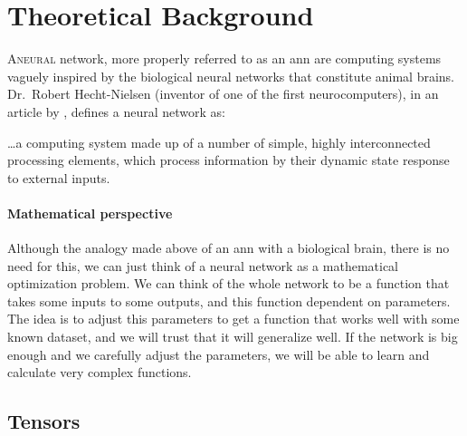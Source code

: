 

\chapter{Theoretical Background}\label{cha:theory}



\lettrine{A}{neural} network, more properly referred to as an \gls{ann} are
computing systems vaguely inspired by the biological neural networks that
constitute animal brains. Dr.\ Robert Hecht-Nielsen (inventor of one of the
first neurocomputers), in an article by
, defines a neural network as:

\begin{quoteBox}
  \ldots a computing system made up of a number of simple, highly
  interconnected processing elements, which process information by their
  dynamic state response to external inputs.
  \tcblower{}
\end{quoteBox}

\subsubsection{Mathematical perspective}

Although the analogy made above of an \gls{ann} with a biological brain, there
is no need for this, we can just think of a neural network as a mathematical
optimization problem. We can think of the whole network to be a function that
takes some inputs to some outputs, and this function dependent on
parameters. The idea is to adjust this parameters to get a function that works
well with some known dataset, and we will trust that it will generalize
well. If the network is big enough and we carefully adjust the parameters, we
will be able to learn and calculate very complex functions.



\section{Tensors}

